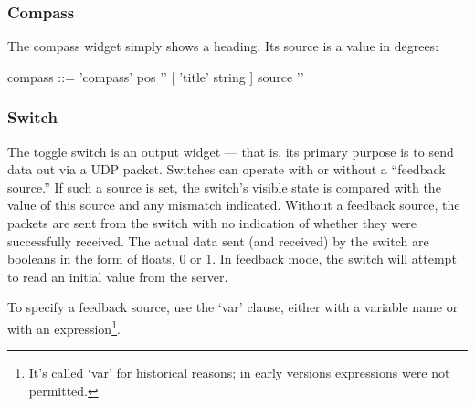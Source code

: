                
\subsubsection{Compass}
The compass widget simply shows a heading. Its source is a value
in degrees:
\begin{v}
compass     ::= 'compass' pos '{'
                [ 'title' string ]
                source
                '}'
\end{v}


\subsubsection{Switch}
The toggle switch is an output widget --- that is, its primary purpose is to
send data out via a UDP packet. Switches can operate with or without a
``feedback source.'' If such a source is set, the switch's visible state is
compared with the value of this source and any mismatch indicated. Without a
feedback source, the packets are sent from the switch with no indication of
whether they were successfully received. The actual data sent (and received)
by the switch are booleans in the form of floats, 0 or 1. In feedback
mode, the switch will attempt to read an initial value from the server.

To specify a feedback source, use the `var' clause, either with a variable name
or with an expression\footnote{It's called `var' for historical reasons; in early versions expressions were not permitted.}.


